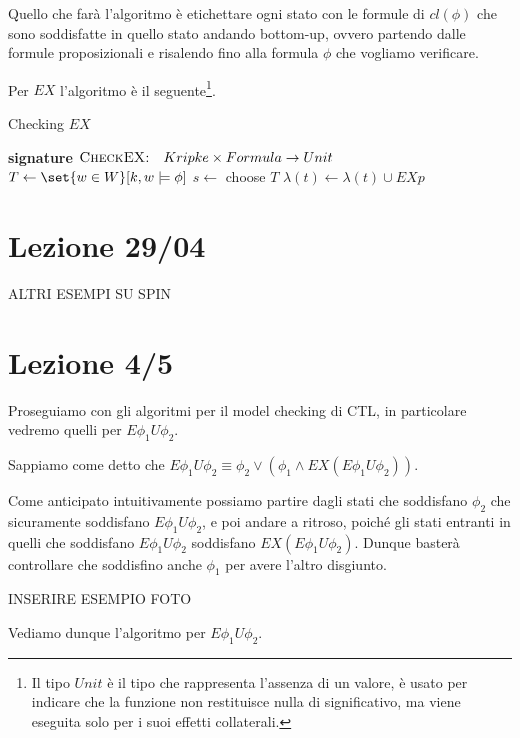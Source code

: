 Quello che farà l'algoritmo è etichettare ogni stato con le formule di \(cl(\phi)\) che sono soddisfatte in quello stato andando bottom-up\@, ovvero partendo dalle formule proposizionali e risalendo fino alla formula \(\phi\) che vogliamo verificare.

Per \(EX\) l'algoritmo è il seguente\footnote{Il tipo \(Unit\) è il tipo che rappresenta l'assenza di un valore, è usato per indicare che la funzione non restituisce nulla di significativo, ma viene eseguita solo per i suoi effetti collaterali.}.

\begin{algorithmdesc}{Checking \(EX\)}
  \begin{algorithmic}[1]
    \Statex{} \textbf{signature} \(\textsc{CheckEX:} \quad Kripke \times Formula \to Unit\)
    \State{} \(T \gets \set{w \in W}[k,w\models \phi]\)
    \State{} \(s \gets\) choose \(T\)
    \State{} \(\lambda(t)\gets \lambda(t)\cup{EX p}\)
    \EndFor{}
    \EndWhile{}
    \EndFunction{}
  \end{algorithmic}
\end{algorithmdesc}

\chapter{Lezione 29/04}

ALTRI ESEMPI SU SPIN\@

\chapter{Lezione 4/5}

Proseguiamo con gli algoritmi per il model checking di CTL\@, in particolare vedremo quelli per \(E\phi_1 U \phi_2\).

Sappiamo come detto che \(E \phi_1 U \phi_2 \equiv \phi_2 \lor (\phi_1 \land EX(E \phi_1 U \phi_2))\).

Come anticipato intuitivamente possiamo partire dagli stati che soddisfano \(\phi_2\) che sicuramente soddisfano \(E \phi_1 U \phi_2\), e poi andare a ritroso, poiché gli stati entranti in quelli che soddisfano \(E \phi_1 U \phi_2\) soddisfano \(EX(E \phi_1 U \phi_2)\). Dunque basterà controllare che soddisfino anche \(\phi_1\) per avere l'altro disgiunto.

INSERIRE ESEMPIO FOTO

Vediamo dunque l'algoritmo per \(E\phi_1 U \phi_2\).

